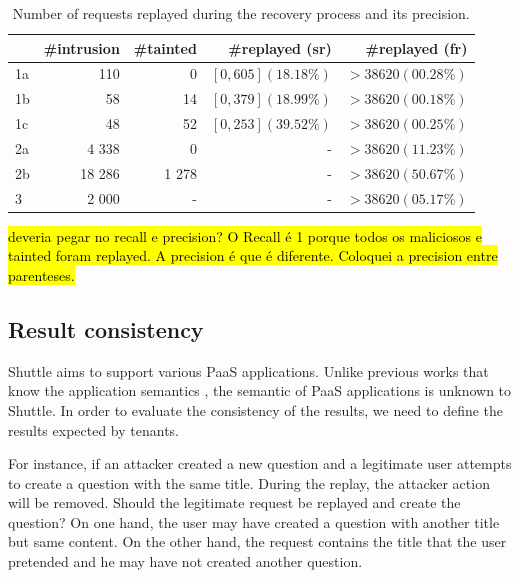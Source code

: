 \begin{table}
\centering
\begin{tabular}{l|rrrr}
    & \#intrusion & \#tainted & \#replayed (sr)               & \#replayed (fr)     \\ \hline
1a       & 110          & 0          & $[0, 605] (18.18\%)$   & $> 38 620 (00.28\%)$  \\
1b       & 58           & 14         & $[0, 379] (18.99\%)$   & $> 38 620 (00.18\%)$          \\
1c       & 48           & 52         & $[0, 253] (39.52\%)$   & $> 38 620 (00.25\%)$          \\
2a       & 4 338        & 0          &  -                     & $> 38 620 (11.23\%)$      \\
2b       & 18 286       & 1 278      &  -                     & $> 38 620 (50.67\%)$  \\
3        & 2 000        & -          &  -                     & $> 38 620 (05.17\%)$  \\
\end{tabular}
  \caption{Number of requests replayed during the recovery process and its precision.}
  \label{tab:accuracy}
  \vspace{-5mm}
\end{table}




\hl{deveria pegar no recall e precision? O Recall é 1 porque todos os maliciosos e tainted foram replayed. A precision é que é diferente. Coloquei a precision entre parenteses. }


\subsection{Result consistency}\label{sec:eval:accuracy:consistency}
Shuttle aims to support various \ac{PaaS} applications. Unlike previous works that know the application semantics \cite{undoForOperators}, the semantic of \ac{PaaS} applications is unknown to Shuttle. In order to evaluate the consistency of the results, we need to define the results expected by tenants. 

For instance, if an attacker created a new question and a legitimate user attempts to create a question with the same title. During the replay, the attacker action will be removed. Should the legitimate request be replayed and create the question? On one hand, the user may have created a question with another title but same content. On the other hand, the request contains the title that the user pretended and he may have not created another question. 

